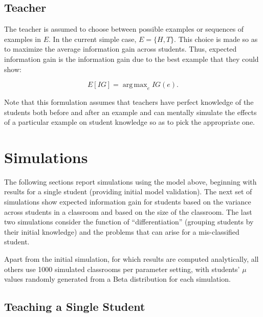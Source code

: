 \documentclass[10pt,letterpaper]{article}
\DeclareMathOperator*{\argmax}{arg\,max}
\begin{document}
\subsection{Teacher}

The teacher is assumed to choose between possible examples or sequences of examples in $E$. In the current simple case, $E=\{H,T\}$. This choice is made so as to maximize the average information gain across students. Thus, expected information gain is the information gain due to the best example that they could show:

\begin{equation}
E[IG] = \argmax_e {IG(e)}.
\end{equation}

\noindent Note that this formulation assumes that teachers have perfect knowledge of the students both before and after an example and can mentally simulate the effects of a particular example on student knowledge so as to pick the appropriate one. 

 \section{Simulations}

The following sections report simulations using the model above, beginning with results for a single student (providing initial model validation). The next set of simulations show expected information gain for students based on the variance across students in a classroom and based on the size of the classroom. The last two simulations consider the function of ``differentiation'' (grouping students by their initial knowledge) and the problems that can arise for a mis-classified student. 

Apart from the initial simulation, for which results are computed analytically, all others use 1000 simulated classrooms per parameter setting, with students' $\mu$ values randomly generated from a Beta distribution for each simulation.

\subsection{Teaching a Single Student}
\end{document}
